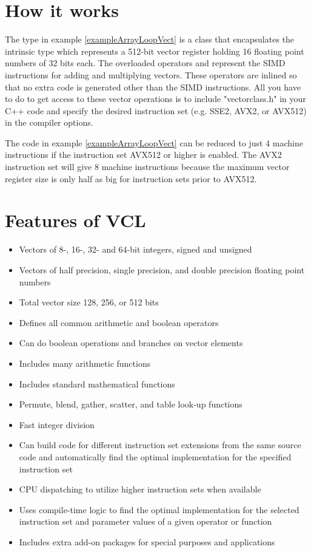 \documentclass[vcl_manual.tex]{subfiles}
\begin{document}
\section{How it works} \label{HowItWorks}
The type  in example \ref{exampleArrayLoopVect} is a class that encapsulates the intrinsic type 
 which represents a 512-bit vector register holding 16 floating point numbers of 32 bits each. The overloaded operators \codei{+} and \codei{*} represent the SIMD instructions for adding and multiplying vectors. These operators are inlined so that no extra code is generated other than the SIMD instructions. All you have to do to get access to these vector operations is to include "vectorclass.h" in your C++ code and specify the desired instruction set (e.g. SSE2, AVX2, or AVX512) in the compiler options.

The code in example \ref{exampleArrayLoopVect} can be reduced to just 4 machine instructions if the instruction set AVX512 or higher is enabled. The AVX2 instruction set will give 8 machine instructions because the maximum vector register size is only half as big for instruction sets prior to AVX512.

\section{Features of VCL} \label{Features}

\begin{itemize}
\item Vectors of 8-, 16-, 32- and 64-bit integers, signed and unsigned
\item Vectors of half precision, single precision, and double precision floating point numbers
\item Total vector size 128, 256, or 512 bits
\item Defines all common arithmetic and boolean operators
\item Can do boolean operations and branches on vector elements
\item Includes many arithmetic functions
\item Includes standard mathematical functions
\item Permute, blend, gather, scatter, and table look-up functions
\item Fast integer division
\item Can build code for different instruction set extensions from the same source code and automatically find the optimal implementation for the specified instruction set
\item CPU dispatching to utilize higher instruction sets when available
\item Uses compile-time logic to find the optimal implementation for the selected instruction set and parameter values of a given operator or function
\item Includes extra add-on packages for special purposes and applications
\end{itemize}
\end{document}
